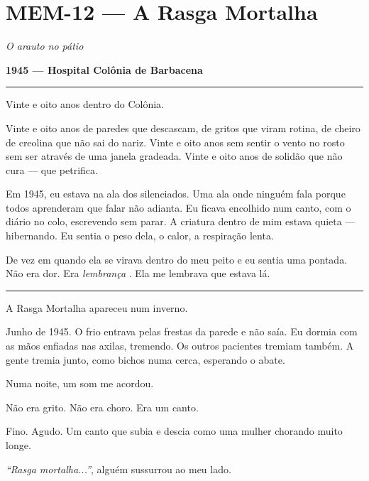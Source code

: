 \section*{\textbf{MEM-12} --- A Rasga Mortalha}

\noindent \textit{O arauto no pátio}

\noindent \textbf{1945 --- Hospital Colônia de Barbacena}

\vspace{0.5em}\noindent\rule{\textwidth}{0.5pt}\vspace{0.5em}

\noindent Vinte e oito anos dentro do Colônia.

\noindent Vinte e oito anos de paredes que descascam, de gritos que viram rotina, de cheiro de creolina que não sai do nariz. Vinte e oito anos sem sentir o vento no rosto sem ser através de uma janela gradeada. Vinte e oito anos de solidão que não cura --- que petrifica.

\noindent Em 1945, eu estava na ala dos silenciados. Uma ala onde ninguém fala porque todos aprenderam que falar não adianta. Eu ficava encolhido num canto, com o diário no colo, escrevendo sem parar. A criatura dentro de mim estava quieta --- hibernando. Eu sentia o peso dela, o calor, a respiração lenta.

\noindent De vez em quando ela se virava dentro do meu peito e eu sentia uma pontada. Não era dor. Era \textit{lembrança} . Ela me lembrava que estava lá.

\vspace{0.5em}\noindent\rule{\textwidth}{0.5pt}\vspace{0.5em}

\noindent A Rasga Mortalha apareceu num inverno.

\noindent Junho de 1945. O frio entrava pelas frestas da parede e não saía. Eu dormia com as mãos enfiadas nas axilas, tremendo. Os outros pacientes tremiam também. A gente tremia junto, como bichos numa cerca, esperando o abate.

\noindent Numa noite, um som me acordou.

\noindent Não era grito.
Não era choro.
Era um canto.

\noindent Fino. Agudo. Um canto que subia e descia como uma mulher chorando muito longe.

\noindent \textit{\textquotedblleft{}Rasga mortalha...\textquotedblright{}}, alguém sussurrou ao meu lado.

